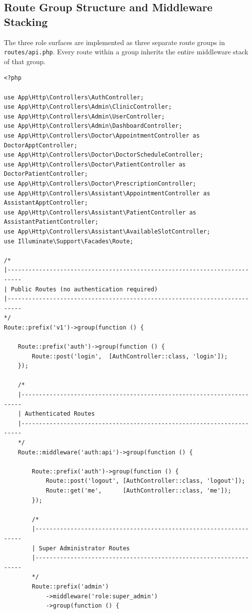 \subsection{Route Group Structure and Middleware Stacking}

The three role surfaces are implemented as three separate route groups
in \texttt{routes/api.php}. Every route within a group inherits the
entire middleware stack of that group.

\begin{lstlisting}[style=php, caption={\texttt{routes/api.php} ---
  Route group definitions with stacked middleware.}]
<?php

use App\Http\Controllers\AuthController;
use App\Http\Controllers\Admin\ClinicController;
use App\Http\Controllers\Admin\UserController;
use App\Http\Controllers\Admin\DashboardController;
use App\Http\Controllers\Doctor\AppointmentController as DoctorApptController;
use App\Http\Controllers\Doctor\DoctorScheduleController;
use App\Http\Controllers\Doctor\PatientController as DoctorPatientController;
use App\Http\Controllers\Doctor\PrescriptionController;
use App\Http\Controllers\Assistant\AppointmentController as AssistantApptController;
use App\Http\Controllers\Assistant\PatientController as AssistantPatientController;
use App\Http\Controllers\Assistant\AvailableSlotController;
use Illuminate\Support\Facades\Route;

/*
|--------------------------------------------------------------------------
| Public Routes (no authentication required)
|--------------------------------------------------------------------------
*/
Route::prefix('v1')->group(function () {

    Route::prefix('auth')->group(function () {
        Route::post('login',  [AuthController::class, 'login']);
    });

    /*
    |----------------------------------------------------------------------
    | Authenticated Routes
    |----------------------------------------------------------------------
    */
    Route::middleware('auth:api')->group(function () {

        Route::prefix('auth')->group(function () {
            Route::post('logout', [AuthController::class, 'logout']);
            Route::get('me',      [AuthController::class, 'me']);
        });

        /*
        |------------------------------------------------------------------
        | Super Administrator Routes
        |------------------------------------------------------------------
        */
        Route::prefix('admin')
            ->middleware('role:super_admin')
            ->group(function () {


\end{lstlisting}
